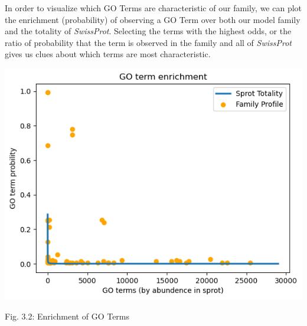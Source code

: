 \documentclass[10pt,twocolumn,letterpaper]{article}
\begin{document}
In order to visualize which GO Terms are characteristic of our family, we can plot the enrichment (probability) of observing a GO Term over both our model family and the totality of \textit{SwissProt}. Selecting the terms with the highest odds, or the ratio of probability that the term is observed in the family and all of \textit{SwissProt} gives us clues about which terms are most characteristic. 

\begin{center}
    \includegraphics[scale=0.4]{report/img/go_term_enrichment.png}
\end{center}

\begin{center}
    \small{Fig. 3.2: Enrichment of GO Terms}
\end{center}
\end{document}
